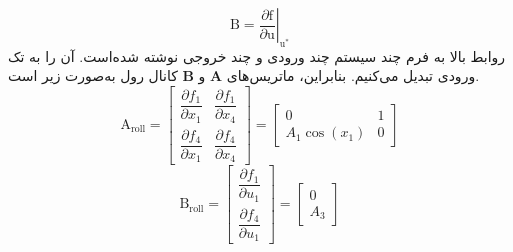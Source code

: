 \documentclass{CCI2020}
\begin{document}
\begin{equation}
	\boldsymbol{\mathrm{B}} = \left.\dfrac{\partial \boldsymbol{\mathrm{f}}}{\partial \boldsymbol{\mathrm{u}}}\right\vert_{\boldsymbol{\mathrm{u}^*}}
\end{equation}
روابط بالا به فرم چند سیستم چند ورودی و چند خروجی نوشته ‌شده‌است. آن را به تک ورودی تبدیل می‌کنیم.
بنابراین، ماتریس‌های $\boldsymbol{A}$ و $\boldsymbol{B}$ کانال رول به‌صورت زیر است.
\begin{equation}
	\boldsymbol{\mathrm{A}}_{\text{roll}} = \begin{bmatrix}
		\dfrac{\partial  f_1}{\partial  x_1}& \dfrac{\partial  f_1}{\partial  x_4}
		\\[1em]
		\dfrac{\partial  f_4}{\partial  x_1}& \dfrac{\partial  f_4}{\partial  x_4}
	\end{bmatrix} = 
	\begin{bmatrix}
		0 & 1\\
		A_1\cos(x_1) & 0
	\end{bmatrix}
\end{equation}
\begin{equation}
	\boldsymbol{\mathrm{B}}_{\text{roll}}  = \begin{bmatrix}
		\dfrac{\partial  f_1}{\partial  u_1}
		\\[1em]
		\dfrac{\partial  f_4}{\partial  u_1}
	\end{bmatrix} = 
	\begin{bmatrix}
		0\\
		A_3
	\end{bmatrix}
\end{equation}
\end{document}
